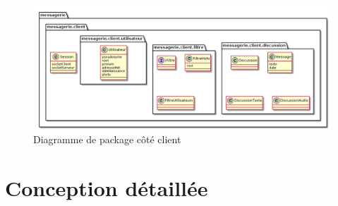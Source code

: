 \documentclass[a4paper,12pt]{article}
\begin{document}
	\begin{figure}[H]
		\centerline{\includegraphics[width=16.5cm]{../diagrammes/img/packageClient.png}}
		\caption{Diagramme de package côté client}
	\end{figure}


	\section{Conception détaillée}


\end{document}
